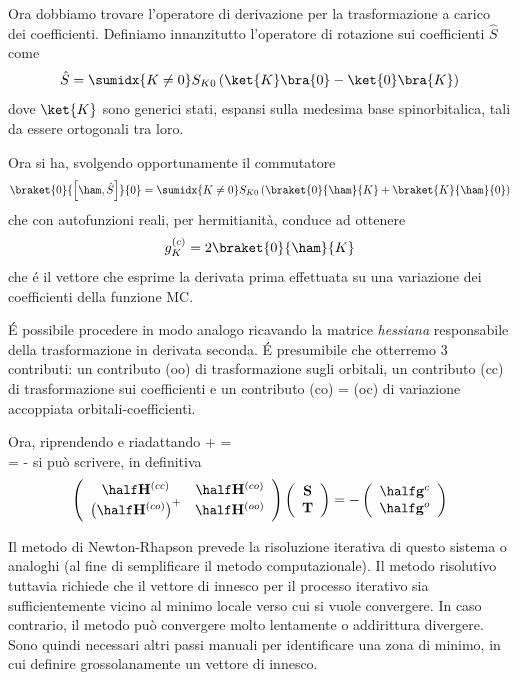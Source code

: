 Ora dobbiamo trovare l'operatore di derivazione per la trasformazione a
carico dei coefficienti. Definiamo innanzitutto l'operatore di rotazione
sui coefficienti $\hat{S}$ come
$$
\hat{S} = \sumidx{K\neq0} S_{K0} \left(\ket{K}\bra{0} - \ket{0}\bra{K}
\right)
$$
dove $\ket{K}$ sono generici stati, espansi sulla medesima base
spinorbitalica, tali da essere ortogonali tra loro.

Ora si ha, svolgendo opportunamente il commutatore
$$
\braket{0}{\left[\ham,\hat{S}\right]}{0} =
\sumidx{K\neq0}S_{K0} \left( \braket{0}{\ham}{K} + \braket{K}{\ham}{0}
\right)
$$
che con autofunzioni reali, per hermitianit\`a, conduce ad ottenere
$$
g_K^{(c)} = 2 \braket{0}{\ham}{K}
$$
che \'e il vettore che esprime la derivata prima effettuata su una
variazione dei coefficienti della funzione MC.

\'E possibile procedere in modo analogo ricavando la matrice
\textit{hessiana} responsabile della trasformazione in derivata seconda.
\'E presumibile che otterremo 3 contributi: un contributo (oo) di
trasformazione sugli orbitali, un contributo (cc) di trasformazione sui
coefficienti e un contributo (co) = (oc) di variazione accoppiata
orbitali-coefficienti.

Ora, riprendendo e riadattando
\beqas
{} +  =  \\
 = - 
\eeqas
si pu\`o scrivere, in definitiva
$$
\left(
\begin{array}{cc}
\half \mathbf{H}^{(cc)} & \half \mathbf{H}^{(co)} \\
\left( \half \mathbf{H}^{(co)} \right)^+ & \half \mathbf{H}^{(oo)} \\
\end{array}
\right) 
\left(
\begin{array}{c}
\mathbf{S} \\
\mathbf{T} \\
\end{array}
\right) = -
\left(
\begin{array}{c}
\half \mathbf{g}^{c} \\
\half \mathbf{g}^{o} \\
\end{array}
\right)
$$

Il metodo di Newton-Rhapson prevede la risoluzione iterativa di questo
sistema o analoghi (al fine di semplificare il metodo computazionale).
Il metodo risolutivo tuttavia richiede che il vettore di innesco per il
processo iterativo sia sufficientemente vicino al minimo locale verso
cui si vuole convergere. In caso contrario, il metodo pu\`o convergere
molto lentamente o addirittura divergere. Sono quindi necessari altri
passi manuali per identificare una zona di minimo, in cui definire
grossolanamente un vettore di innesco.

